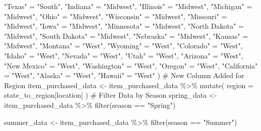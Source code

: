 \documentclass[
  letterpaper,
  DIV=11,
  numbers=noendperiod]{scrartcl}
\newenvironment{Shaded}{\begin{snugshade}}{\end{snugshade}}
\newcommand{\AttributeTok}[1]{\textcolor[rgb]{0.40,0.45,0.13}{#1}}
\newcommand{\CommentTok}[1]{\textcolor[rgb]{0.37,0.37,0.37}{#1}}
\newcommand{\FunctionTok}[1]{\textcolor[rgb]{0.28,0.35,0.67}{#1}}
\newcommand{\NormalTok}[1]{\textcolor[rgb]{0.00,0.23,0.31}{#1}}
\newcommand{\OtherTok}[1]{\textcolor[rgb]{0.00,0.23,0.31}{#1}}
\newcommand{\SpecialCharTok}[1]{\textcolor[rgb]{0.37,0.37,0.37}{#1}}
\newcommand{\StringTok}[1]{\textcolor[rgb]{0.13,0.47,0.30}{#1}}
\begin{document}
\begin{Shaded}
\begin{Highlighting}[]
  \StringTok{"Texas"} \OtherTok{=} \StringTok{"South"}\NormalTok{,}
  \StringTok{"Indiana"} \OtherTok{=} \StringTok{"Midwest"}\NormalTok{, }
  \StringTok{"Illinois"} \OtherTok{=} \StringTok{"Midwest"}\NormalTok{,}
  \StringTok{"Michigan"} \OtherTok{=} \StringTok{"Midwest"}\NormalTok{,}
  \StringTok{"Ohio"} \OtherTok{=} \StringTok{"Midwest"}\NormalTok{,}
  \StringTok{"Wisconsin"} \OtherTok{=} \StringTok{"Midwest"}\NormalTok{,}
  \StringTok{"Missouri"} \OtherTok{=} \StringTok{"Midwest"}\NormalTok{,}
  \StringTok{"Iowa"} \OtherTok{=} \StringTok{"Midwest"}\NormalTok{,}
  \StringTok{"Minnesota"} \OtherTok{=} \StringTok{"Midwest"}\NormalTok{,}
  \StringTok{"North Dakota"} \OtherTok{=} \StringTok{"Midwest"}\NormalTok{,}
  \StringTok{"South Dakota"} \OtherTok{=} \StringTok{"Midwest"}\NormalTok{,}
  \StringTok{"Nebraska"} \OtherTok{=} \StringTok{"Midwest"}\NormalTok{,}
  \StringTok{"Kansas"} \OtherTok{=} \StringTok{"Midwest"}\NormalTok{,}
  \StringTok{"Montana"} \OtherTok{=} \StringTok{"West"}\NormalTok{,}
  \StringTok{"Wyoming"} \OtherTok{=} \StringTok{"West"}\NormalTok{,}
  \StringTok{"Colorado"} \OtherTok{=} \StringTok{"West"}\NormalTok{,}
  \StringTok{"Idaho"} \OtherTok{=} \StringTok{"West"}\NormalTok{,}
  \StringTok{"Nevada"} \OtherTok{=} \StringTok{"West"}\NormalTok{,}
  \StringTok{"Utah"} \OtherTok{=} \StringTok{"West"}\NormalTok{,}
  \StringTok{"Arizona"} \OtherTok{=} \StringTok{"West"}\NormalTok{,}
  \StringTok{"New Mexico"} \OtherTok{=} \StringTok{"West"}\NormalTok{,}
  \StringTok{"Washington"} \OtherTok{=} \StringTok{"West"}\NormalTok{,}
  \StringTok{"Oregon"} \OtherTok{=} \StringTok{"West"}\NormalTok{,}
  \StringTok{"California"} \OtherTok{=} \StringTok{"West"}\NormalTok{,}
  \StringTok{"Alaska"} \OtherTok{=} \StringTok{"West"}\NormalTok{,}
  \StringTok{"Hawaii"} \OtherTok{=} \StringTok{"West"}
\NormalTok{)}
\CommentTok{\# New Column Added for Region}
\NormalTok{item\_purchased\_data }\OtherTok{\textless{}{-}}\NormalTok{ item\_purchased\_data }\SpecialCharTok{\%\textgreater{}\%}
  \FunctionTok{mutate}\NormalTok{(}
    \AttributeTok{region =}\NormalTok{ state\_to\_region[location]}
\NormalTok{  )}
\CommentTok{\# Filter Data by Season}
\NormalTok{spring\_data }\OtherTok{\textless{}{-}}\NormalTok{ item\_purchased\_data }\SpecialCharTok{\%\textgreater{}\%}
  \FunctionTok{filter}\NormalTok{(season }\SpecialCharTok{==} \StringTok{"Spring"}\NormalTok{)}

\NormalTok{summer\_data }\OtherTok{\textless{}{-}}\NormalTok{ item\_purchased\_data }\SpecialCharTok{\%\textgreater{}\%}
  \FunctionTok{filter}\NormalTok{(season }\SpecialCharTok{==} \StringTok{"Summer"}\NormalTok{)}


\end{Highlighting}
\end{Shaded}
\end{document}
